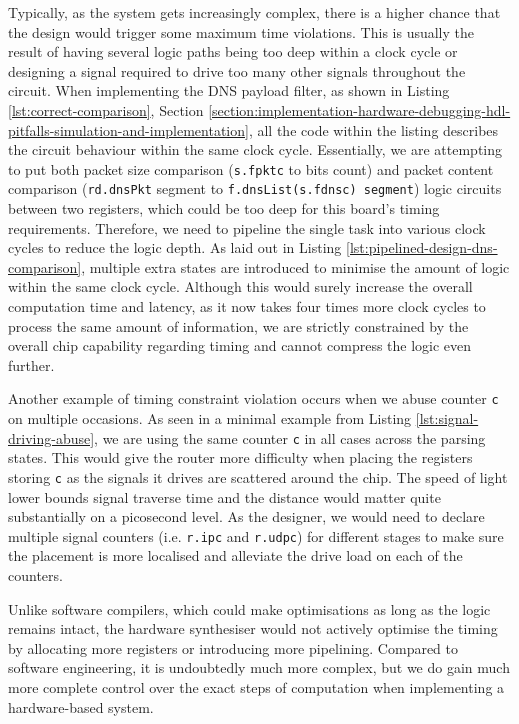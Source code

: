 \documentclass[a4paper]{report}
\newcommand{\code}{\texttt}
\begin{document}
Typically, as the system gets increasingly complex, there is a higher chance that the design would trigger some maximum time violations. This is usually the result of having several logic paths being too deep within a clock cycle or designing a signal required to drive too many other signals throughout the circuit. When implementing the DNS payload filter, as shown in Listing \ref{lst:correct-comparison}, Section \ref{section:implementation-hardware-debugging-hdl-pitfalls-simulation-and-implementation}, all the code within the listing describes the circuit behaviour within the same clock cycle. Essentially, we are attempting to put both packet size comparison (\code{s.fpktc} to bits count) and packet content comparison (\code{rd.dnsPkt} segment to \code{f.dnsList(s.fdnsc) segment}) logic circuits between two registers, which could be too deep for this board's timing requirements. Therefore, we need to pipeline the single task into various clock cycles to reduce the logic depth. As laid out in Listing \ref{lst:pipelined-design-dns-comparison}, multiple extra states are introduced to minimise the amount of logic within the same clock cycle. Although this would surely increase the overall computation time and latency, as it now takes four times more clock cycles to process the same amount of information, we are strictly constrained by the overall chip capability regarding timing and cannot compress the logic even further.

Another example of timing constraint violation occurs when we abuse counter \code{c} on multiple occasions. As seen in a minimal example from Listing \ref{lst:signal-driving-abuse}, we are using the same counter \code{c} in all cases across the parsing states. This would give the router more difficulty when placing the registers storing \code{c} as the signals it drives are scattered around the chip. The speed of light lower bounds signal traverse time and the distance would matter quite substantially on a picosecond level. As the designer, we would need to declare multiple signal counters (i.e. \code{r.ipc} and \code{r.udpc}) for different stages to make sure the placement is more localised and alleviate the drive load on each of the counters. 

Unlike software compilers, which could make optimisations as long as the logic remains intact, the hardware synthesiser would not actively optimise the timing by allocating more registers or introducing more pipelining. Compared to software engineering, it is undoubtedly much more complex, but we do gain much more complete control over the exact steps of computation when implementing a hardware-based system.
\end{document}
